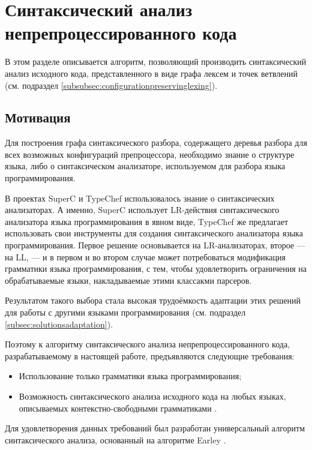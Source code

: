 \clearpage

\section{Синтаксический анализ непрепроцессированного кода}

В этом разделе описывается алгоритм, позволяющий производить синтаксический анализ исходного кода, представленного в виде графа лексем и точек ветвлений (см. подраздел \ref{subsubsec:configurationpreservinglexing}).

\subsection{Мотивация}

Для построения графа синтаксического разбора, содержащего деревья разбора для всех возможных конфигураций препроцессора, необходимо знание о структуре языка, либо о синтаксическом анализаторе, используемом для разбора языка программирования.

В проектах SuperC и TypeChef использовалось знание о синтаксических анализаторах. А именно, SuperC использует LR-действия синтаксического анализатора языка программирования в явном виде, TypeChef же предлагает использовать свои инструменты для создания синтаксического анализатора языка программирования. Первое решение основывается на LR-анализаторах, второе --- на LL, --- и в первом и во втором случае может потребоваться модификация грамматики языка программирования, с тем, чтобы удовлетворить ограничения на обрабатываемые языки, накладываемые этими классакми парсеров.

Результатом такого выбора стала высокая трудоёмкость адаптации этих решений для работы с другими языками программирования (см. подраздел \ref{subsec:solutionsadaptation}).

Поэтому к алгоритму синтаксического анализа непрепроцессированного кода, разрабатываемому в настоящей работе, предъявляются следующие требования:

\begin{itemize}
\item Использование только грамматики языка программирования;
\item Возможность синтаксического анализа исходного кода на любых языках, описываемых контекстно-свободными грамматиками \cite{cfg}.
\end{itemize}

Для удовлетворения данных требований был разработан универсальный алгоритм синтаксического анализа, основанный на алгоритме Earley \cite{earley68}.

